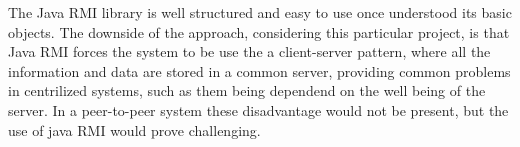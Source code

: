 \documentclass[12pt, a4paper]{report}
\begin{document}
The Java RMI library is well structured and easy to use once understood its
 basic objects. The downside of the approach, considering this particular
 project, is that Java RMI forces the system to be use the a client-server pattern, where all the
 information and data are stored in a common server, providing common problems in centrilized systems, 
 such as them being dependend on the well being of the server.
 In a peer-to-peer system these disadvantage would not be present, but the use of java RMI would prove
 challenging.

% 
% 
\end{document}
